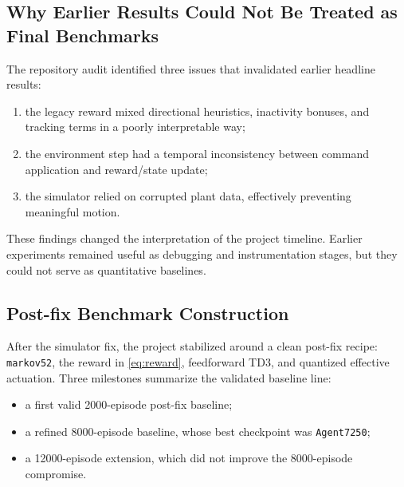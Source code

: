 \documentclass[conference]{IEEEtran}
\begin{document}
\subsection{Why Earlier Results Could Not Be Treated as Final Benchmarks}
The repository audit identified three issues that invalidated earlier headline results:
\begin{enumerate}
    \item the legacy reward mixed directional heuristics, inactivity bonuses, and tracking terms in a poorly interpretable way;
    \item the environment step had a temporal inconsistency between command application and reward/state update;
    \item the simulator relied on corrupted plant data, effectively preventing meaningful motion.
\end{enumerate}
These findings changed the interpretation of the project timeline. Earlier experiments remained useful as debugging and instrumentation stages, but they could not serve as quantitative baselines.

\subsection{Post-fix Benchmark Construction}
After the simulator fix, the project stabilized around a clean post-fix recipe: \texttt{markov52}, the reward in \eqref{eq:reward}, feedforward TD3, and quantized effective actuation. Three milestones summarize the validated baseline line:
\begin{itemize}
    \item a first valid 2000-episode post-fix baseline;
    \item a refined 8000-episode baseline, whose best checkpoint was \texttt{Agent7250};
    \item a 12000-episode extension, which did not improve the 8000-episode compromise.
\end{itemize}
\end{document}
